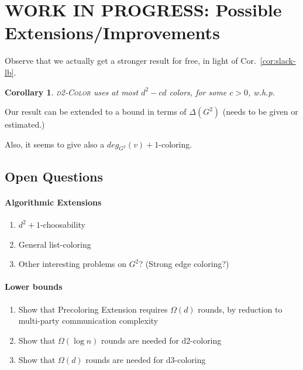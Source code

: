 \documentclass[12pt]{article}
\newtheorem{corollary}[theorem]{Corollary}
\newcommand{\alg}[1]{\textsc{#1}}
\begin{document}




\appendix

\section{WORK IN PROGRESS: Possible Extensions/Improvements}

Observe that we actually get a stronger result for free, in light of 
Cor.~\ref{cor:slack-lb}.

\begin{corollary}
\alg{d2-Color} uses at most $d^2 - cd$ colors, for some $c > 0$, w.h.p.
\end{corollary}

Our result can be extended to a bound in terms of $\Delta(G^2)$ (needs to be given or estimated.)

Also, it seems to give also a $deg_{G^2}(v)+1$-coloring.
    
\subsection{Open Questions}

\paragraph{Algorithmic Extensions}
\begin{enumerate}

    \item $d^2+1$-choosability
    \item General list-coloring
    \item Other interesting problems on $G^2$? (Strong edge coloring?)
\end{enumerate}
\paragraph{Lower bounds}
\begin{enumerate}
    \item Show that Precoloring Extension requires $\Omega(d)$ rounds, by reduction to multi-party communication complexity
    \item Show that $\Omega(\log n)$ rounds are needed for d2-coloring
    \item Show that $\Omega(d)$ rounds are needed for d3-coloring
\end{enumerate}
\end{document}
